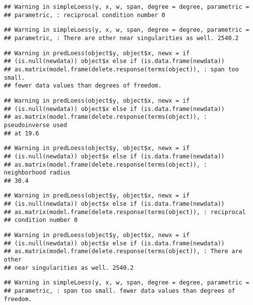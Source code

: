 \documentclass[]{article}
\begin{document}
\begin{verbatim}
## Warning in simpleLoess(y, x, w, span, degree = degree, parametric =
## parametric, : reciprocal condition number 0
\end{verbatim}

\begin{verbatim}
## Warning in simpleLoess(y, x, w, span, degree = degree, parametric =
## parametric, : There are other near singularities as well. 2540.2
\end{verbatim}

\begin{verbatim}
## Warning in predLoess(object$y, object$x, newx = if
## (is.null(newdata)) object$x else if (is.data.frame(newdata))
## as.matrix(model.frame(delete.response(terms(object)), : span too small.
## fewer data values than degrees of freedom.
\end{verbatim}

\begin{verbatim}
## Warning in predLoess(object$y, object$x, newx = if
## (is.null(newdata)) object$x else if (is.data.frame(newdata))
## as.matrix(model.frame(delete.response(terms(object)), : pseudoinverse used
## at 19.6
\end{verbatim}

\begin{verbatim}
## Warning in predLoess(object$y, object$x, newx = if
## (is.null(newdata)) object$x else if (is.data.frame(newdata))
## as.matrix(model.frame(delete.response(terms(object)), : neighborhood radius
## 30.4
\end{verbatim}

\begin{verbatim}
## Warning in predLoess(object$y, object$x, newx = if
## (is.null(newdata)) object$x else if (is.data.frame(newdata))
## as.matrix(model.frame(delete.response(terms(object)), : reciprocal
## condition number 0
\end{verbatim}

\begin{verbatim}
## Warning in predLoess(object$y, object$x, newx = if
## (is.null(newdata)) object$x else if (is.data.frame(newdata))
## as.matrix(model.frame(delete.response(terms(object)), : There are other
## near singularities as well. 2540.2
\end{verbatim}

\begin{verbatim}
## Warning in simpleLoess(y, x, w, span, degree = degree, parametric =
## parametric, : span too small. fewer data values than degrees of freedom.
\end{verbatim}
\end{document}
